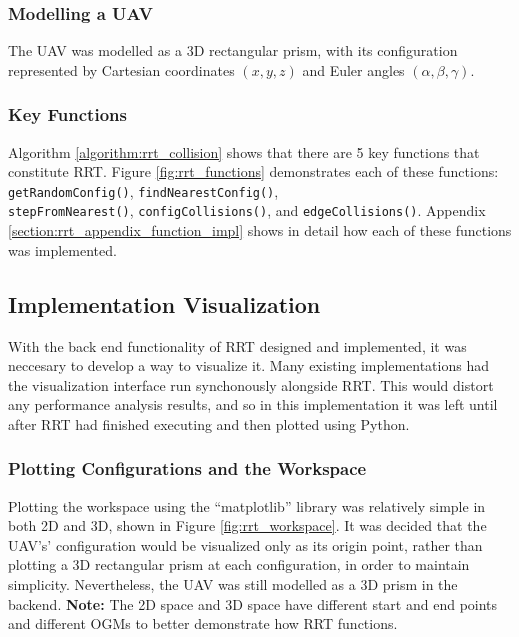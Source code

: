     \subsubsection{Modelling a \gls{UAV}}
        The \gls{UAV} was modelled as a \gls{3D} rectangular prism, with its configuration represented by Cartesian coordinates $(x,y,z)$ and Euler angles $(\alpha, \beta, \gamma)$.

    \subsubsection{Key Functions}
        Algorithm \ref{algorithm:rrt_collision} shows that there are 5 key functions that constitute \gls{RRT}. Figure \ref{fig:rrt_functions} demonstrates each of these functions: \texttt{getRandomConfig()}, \texttt{findNearestConfig()}, \\
        \texttt{stepFromNearest()}, \texttt{configCollisions()}, and \texttt{edgeCollisions()}. Appendix \ref{section:rrt_appendix_function_impl} shows in detail how each of these functions was implemented.
        

\newpage
\subsection{Implementation Visualization}
    With the back end functionality of \gls{RRT} designed and implemented, it was neccesary to develop a way to visualize it. Many existing implementations had the visualization interface run synchonously alongside \gls{RRT}. This would distort any performance analysis results, and so in this implementation it was left until after \gls{RRT} had finished executing and then plotted using Python.

    \subsubsection{Plotting Configurations and the Workspace}
        Plotting the workspace using the ``matplotlib'' library was relatively simple in both \gls{2D} and \gls{3D}, shown in Figure \ref{fig:rrt_workspace}. It was decided that the \gls{UAV}'s' configuration would be visualized only as its origin point, rather than plotting a \gls{3D} rectangular prism at each configuration, in order to maintain simplicity. Nevertheless, the \gls{UAV} was still modelled as a 3D prism in the backend. \textbf{Note:} The 2D space and 3D space have different start and end points and different \glspl{OGM} to better demonstrate how \gls{RRT} functions.
        

